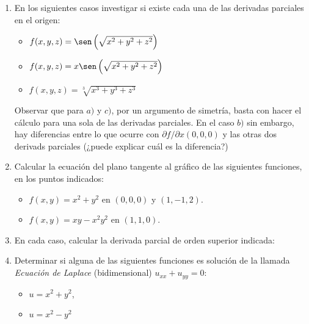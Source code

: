 \documentclass[11pt]{book}
\theoremstyle{definicion}
\theoremstyle{teorema}
\theoremstyle{ejemplo}
\begin{document}
\begin{enumerate}
\item En los siguientes casos investigar si existe cada una de las
  derivadas parciales en el origen:
  \begin{itemize}
    \item[a)] $f(x,y,z)=\sen \left( \sqrt{x^{2}+y^{2}+z^2}
      \right) $
    \item[b)] $f(x,y,z)=x\sen \left( \sqrt{x^{2}+y^{2}+z^2}\right) $
      \item[c)] $f(x,y,z)=
        \sqrt[3]{x^{3}+y^{3}+z^3}$
      \end{itemize}
Observar que para $a)$ y $c)$, por un argumento de simetría, basta con hacer el cálculo para una sola de las derivadas parciales. En el caso $b)$ sin embargo, hay diferencias entre lo que ocurre con $\partial f/\partial x(0,0,0)$ y las otras dos derivads parciales (¿puede explicar cuál es la diferencia?) 

\item Calcular la ecuación del plano tangente al gráfico de las siguientes funciones, en los puntos indicados:

  \begin{itemize}
  \item[a)] $f(x,y)=x^2+y^2$ en $(0,0,0)$ y $(1,-1,2)$.

  \item[b)] $f(x,y)=xy-x^2y^2$ en $(1,1,0)$.
    \end{itemize}


  \item En cada caso, calcular la derivada parcial de orden superior indicada:

  \item Determinar si alguna de las siguientes funciones es solución de la llamada \emph{Ecuación de Laplace} (bidimensional)  $u_{xx}+u_{yy}=0$:
     \begin{itemize}
  \item[a)] $u=x^2+y^2$, 

  \item[b)] $u=x^2-y^2$


\end{itemize}
\end{enumerate}
\end{document}
